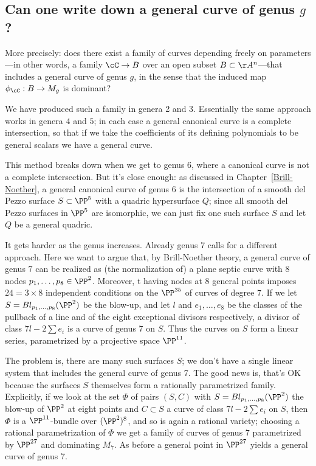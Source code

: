 \subsection{Can one write down a general curve of genus $g$?}\label{mgunirational}

More precisely: does there exist  a family of curves depending freely on parameters---in other words, a family $\cC \to B$ over an open subset $B \subset \AA^n$---that includes a general curve of genus $g$, in the sense that the induced map $\phi_\cC : B \to M_g$ is dominant? 	

We have produced such a family in genera 2 and 3. Essentially
the same approach works in genera $4$ and $5$; in each case a general canonical curve is a complete intersection, so that if we take the coefficients of its defining polynomials to be general scalars we have a general curve.

This method breaks down when we get to genus 6, where a canonical curve is not a complete intersection. But it's close enough: as discussed in Chapter~\ref{Brill-Noether}, a general canonical curve of genus 6 is the intersection of a smooth del Pezzo surface $S \subset \PP^5$ with a quadric hypersurface $Q$; since all smooth del Pezzo surfaces in $\PP^5$ are isomorphic, we can just fix one such surface $S$ and let $Q$ be a general quadric.

It gets harder as the genus increases. Already genus 7 calls for a different approach. Here we want to argue that, by Brill-Noether theory, a general curve of genus $7$ can be realized as (the normalization of) a plane septic curve with 8 nodes $p_1,\dots,p_8 \in \PP^2$. Moreover, t having nodes at 8 general points imposes $24= 3\times 8$ independent conditions on the $\PP^{35}$ of curves of degree 7. 
If we let $S = Bl_{p_1,\dots,p_8}(\PP^2)$ be the blow-up, and let $l$ and $e_1,\dots,e_8$ be the classes of the pullback of a line and of the eight exceptional divisors respectively, a divisor of class $7l - 2 \sum e_i$ is a curve of genus 7 on $S$. Thus the curves on $S$ form a linear series, parametrized by a projective space $\PP^{11}$.

The problem is, there are many such surfaces $S$; we don't have a single linear system that includes the general curve of genus 7. The good news is, that's OK because the surfaces $S$ themselves form a rationally parametrized family. Explicitly, if we look at the set $\Phi$ of pairs $(S, C)$ with $S = Bl_{p_1,\dots,p_8}(\PP^2)$  the blow-up of $\PP^2$ at eight points and $C \subset S$ a curve of class $7l - 2 \sum e_i$ on $S$, then $\Phi$ is a $\PP^{11}$-bundle over $(\PP^2)^8$, and so is again a rational variety; choosing a rational parametrization of $\Phi$ we get a family of curves of genus $7$ parametrized by $\PP^{27}$ and dominating $M_7$. As before a general point in $\PP^{27}$ yields a general curve of genus 7.

